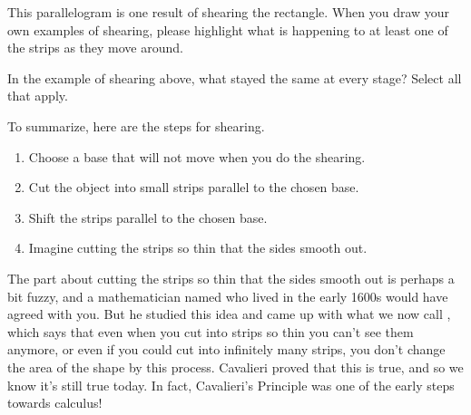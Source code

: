 \documentclass{ximera}
\begin{document}
\begin{example}
\begin{center}
\end{center}
This parallelogram is one result of shearing the rectangle. When you draw your own examples of shearing, please highlight what is happening to at least one of the strips as they move around.

\end{example}

\begin{question}
In the example of shearing above, what stayed the same at every stage? Select all that apply.
\begin{selectAll}
\end{selectAll}
\end{question}

To summarize, here are the steps for shearing.
\begin{enumerate}[label=\arabic{enumi}.]
	\item  Choose a base that will not move when you do the shearing.
	\item Cut the object into small strips parallel to the chosen base.
	\item Shift the strips parallel to the chosen base.
	\item Imagine cutting the strips so thin that the sides smooth out.
\end{enumerate}
The part about cutting the strips so thin that the sides smooth out is perhaps a bit fuzzy, and a mathematician named  who lived in the early 1600s would have agreed with you. But he studied this idea and came up with what we now call , which says that even when you cut into strips so thin you can't see them anymore, or even if you could cut into infinitely many strips, you don't change the area of the shape by this process. Cavalieri proved that this is true, and so we know it's still true today. In fact, Cavalieri's Principle was one of the early steps towards calculus!
\end{document}

